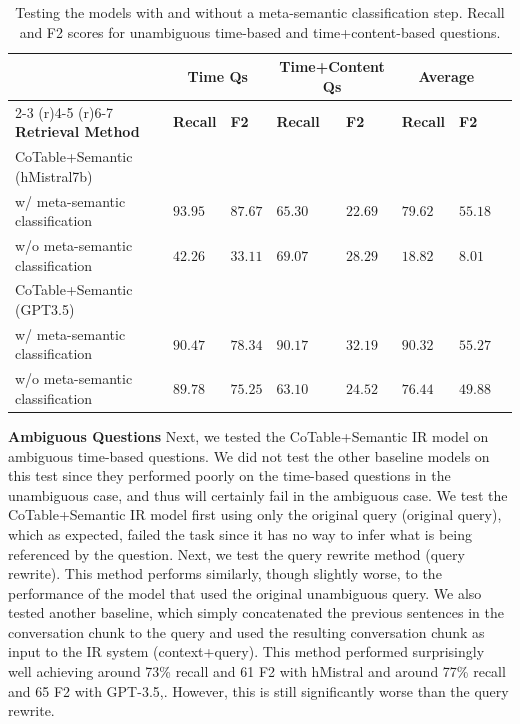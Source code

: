 \documentclass{article}
\begin{document}
\begin{table}
  \centering
  \begin{tabular}{llllllll}
    \toprule
    & \multicolumn{2}{c}{\textbf{Time Qs}}  & \multicolumn{2}{c}{\textbf{Time+Content Qs}} & \multicolumn{2}{c}{\textbf{Average}}\\
    \cmidrule(r){2-3}
    \cmidrule(r){4-5}
    \cmidrule(r){6-7}
    \textbf{Retrieval Method} & \textbf{Recall} & \textbf{F2} & \textbf{Recall} & \textbf{F2} & \textbf{Recall} & \textbf{F2}\\
    \midrule
    CoTable+Semantic (hMistral7b) &  & & & & & \\
    \hspace{15pt}w/ meta-semantic classification & $93.95$  & $87.67$  & $65.30$  & $22.69$   & $79.62$  & $55.18$ \\
    \hspace{15pt}w/o meta-semantic classification & $42.26$  & $33.11$  & $69.07$  & $28.29$   & $18.82$  & $8.01$ \\
    \midrule
    CoTable+Semantic (GPT3.5) &  &  & & & & \\
    \hspace{15pt}w/ meta-semantic classification & $90.47$  & $78.34$  & $90.17$  & $32.19$   & $90.32$ & $55.27$ \\
    \hspace{15pt}w/o meta-semantic classification & $89.78$  & $75.25$  & $63.10$  & $24.52$   & $76.44$  & $49.88$ \\
    \bottomrule
  \end{tabular}
  \caption{Testing the models with and without a meta-semantic classification step. Recall and F2 scores for unambiguous time-based and time+content-based questions.}\label{tab:abl1}
\end{table}

\textbf{Ambiguous Questions} Next, we tested the CoTable+Semantic IR model on ambiguous time-based questions. We did not test the other baseline models on this test since they performed poorly on the time-based questions in the unambiguous case, and thus will certainly fail in the ambiguous case. We test the CoTable+Semantic IR model first using only the original query (original query), which as expected, failed the task since it has no way to infer what is being referenced by the question. Next, we test the query rewrite method (query rewrite). This method performs similarly, though slightly worse, to the performance of the model that used the original unambiguous query. We also tested another baseline, which simply concatenated the previous sentences in the conversation chunk to the query and used the resulting conversation chunk as input to the IR system (context+query). This method performed surprisingly well achieving around 73\% recall and 61 F2 with hMistral and around 77\% recall and 65 F2 with GPT-3.5,. However, this is still significantly worse than the query rewrite. 
\end{document}
